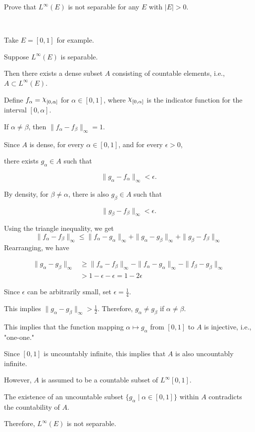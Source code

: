 \documentclass[UTF8,a4paper,10pt]{article}
\begin{document}
\begin{Problem}[]{}
  Prove that \( L^\infty(E) \) is not separable for any \( E \) with \( |E| > 0 \).


\end{Problem}


\begin{solution}\,

Take $E = [0,1]$ for example. 

Suppose $L^\infty(E)$ is separable. 

Then there exists a dense subset $A$ consisting of countable elements, i.e., $A \subset L^\infty(E)$.

Define $f_\alpha = \rchi_{[0,\alpha]}$ for $\alpha \in [0,1]$, where $\rchi_{[0,\alpha]}$ is the indicator function for the interval $[0,\alpha]$. 

If $\alpha \neq \beta$, then $\|f_\alpha - f_\beta\|_\infty = 1$. 

Since $A$ is dense, for every $\alpha \in [0,1]$, and for every $\epsilon > 0$,

there exists $g_\alpha \in A$ such that 

$$\|g_\alpha - f_\alpha\|_\infty < \epsilon.$$ 



By density, for $\beta \neq \alpha$, there is also $g_\beta \in A$ such that 

$$\|g_\beta - f_\beta\|_\infty < \epsilon.$$ 

Using the triangle inequality, we get
\[
\|f_\alpha - f_\beta\|_\infty \leq \|f_\alpha - g_\alpha\|_\infty + \|g_\alpha - g_\beta\|_\infty + \|g_\beta - f_\beta\|_\infty
\]
Rearranging, we have

\begin{equation*}
  \begin{aligned}
    \|g_\alpha - g_\beta\|_\infty &\geq \|f_\alpha - f_\beta\|_\infty - \|f_\alpha - g_\alpha\|_\infty - \|f_\beta - g_\beta\|_\infty\\
    &> 1 - \epsilon - \epsilon = 1 - 2\epsilon
  \end{aligned}
\end{equation*}

Since $\epsilon$ can be arbitrarily small, set $\epsilon = \frac{1}{4}$. 

This implies $\|g_\alpha - g_\beta\|_\infty > \frac{1}{2}$. Therefore, $g_\alpha \neq g_\beta$ if $\alpha \neq \beta$.

This implies that the function mapping $\alpha \mapsto g_\alpha$ from $[0,1]$ to $A$ is injective, i.e., "one-one." 

Since $[0,1]$ is uncountably infinite, this implies that $A$ is also uncountably infinite. 

However, $A$ is assumed to be a countable subset of $L^\infty[0,1]$. 

The existence of an uncountable subset $\{g_\alpha \mid \alpha \in [0,1]\}$ within $A$ contradicts the countability of $A$.

Therefore, $L^\infty(E)$ is not separable.

\end{solution}
\end{document}
